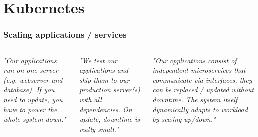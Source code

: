 \section{Kubernetes}

\begin{frame}
	\frametitle{Scaling applications / services}
	\begin{columns}[t]
		
		\textit{\footnotesize "Our applications run on one server (e.g. webserver and database). If you need to update, you have to power the whole system down."}

		
		\textit{\footnotesize "We test our applications and ship them to our production server(s) with all dependencies. On update, downtime is really small."}


		
		\textit{\footnotesize "Our applications consist of independent microservices that communicate via interfaces, they can be replaced / updated without downtime. The system itself dynamically adapts to workload by scaling up/down."}

	\end{columns}

	\begin{columns}
		\centering
		
		\centering
\end{columns}
\end{frame}
